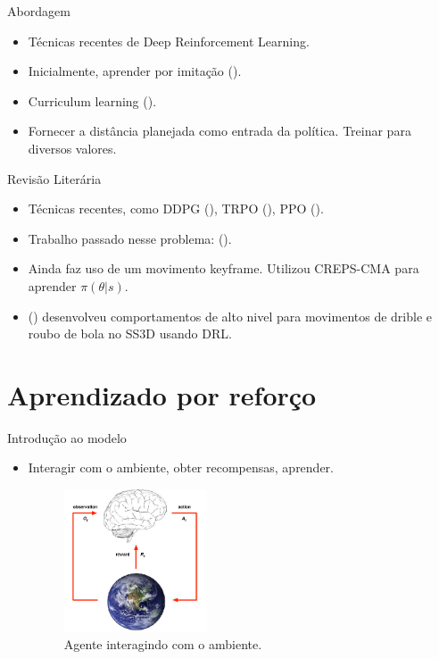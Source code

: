 \documentclass{beamer}
\begin{document}
\begin{frame}{Abordagem}
\begin{itemize}
\setlength\itemsep{1em}
\item
	Técnicas recentes de Deep Reinforcement Learning.
\item
	Inicialmente, aprender por imitação (\cite{deepmimic}).
\item
	Curriculum learning (\cite{BengioCurrLearning}).
\item
	Fornecer a distância planejada como entrada da política. Treinar para diversos valores.
\end{itemize}
\end{frame}

\begin{frame}{Revisão Literária}
\begin{itemize}
\setlength\itemsep{1em}
\item
	Técnicas recentes, como DDPG (\cite{DDPG}), TRPO (\cite{TRPO}), PPO (\cite{PPO}).
\item
	Trabalho passado nesse problema: (\cite{abbas}).
\item
	Ainda faz uso de um movimento keyframe. Utilizou CREPS-CMA para aprender $\pi(\theta|s)$.
\item
	(\cite{TGMuzio}) desenvolveu comportamentos de alto nivel para movimentos de drible e roubo de bola no SS3D usando DRL.	
\end{itemize}
\end{frame}

\section{Aprendizado por reforço}

\begin{frame}{Introdução ao modelo}
\begin{itemize}
\item
	Interagir com o ambiente, obter recompensas, aprender.
\begin{figure}[H]
    \centering
    \includegraphics[width=0.4\textwidth]{figures/RL_basic_model.png} 
    \caption{Agente interagindo com o ambiente.}
    \label{fig:RL_basic_model}
\end{figure}
\end{itemize}
\end{frame}
\end{document}
